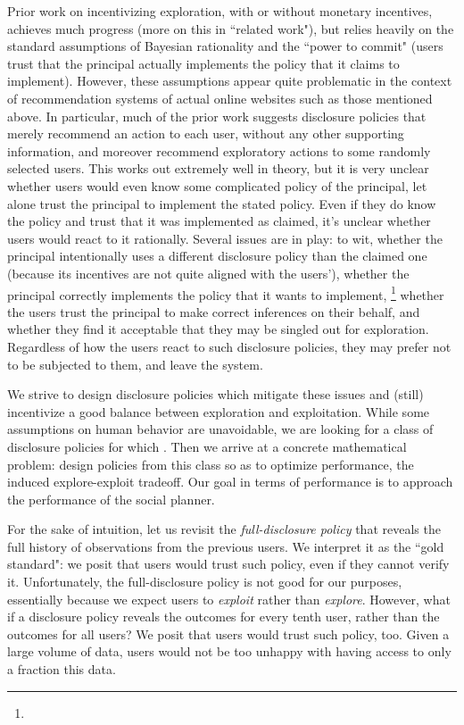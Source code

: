  Prior work on incentivizing exploration, with or without monetary incentives, achieves much progress (more on this in ``related work"), but relies heavily on the standard assumptions of Bayesian rationality and the ``power to commit" (\ie users trust that the principal actually implements the policy that it claims to implement). However, these assumptions appear quite problematic in the context of recommendation systems of actual online websites such as those mentioned above. In particular, much of the prior work suggests disclosure policies that merely recommend an action to each user, without any other supporting information, and moreover recommend exploratory actions to some randomly selected users. This works out extremely well in theory, but it is very unclear whether users would even know some complicated policy of the principal, let alone trust the principal to implement the stated policy. Even if they do know the policy and trust that it was implemented as claimed, it's unclear whether users would react to it rationally.
%
Several issues are in play: to wit, whether the principal intentionally uses a different disclosure policy than the claimed one (\eg because its incentives are not quite aligned with the users'), whether the principal correctly implements the policy that it wants to implement,%
\footnote{}
 whether the users trust the principal to make correct inferences on their behalf, and whether they find it acceptable that they may be singled out for exploration. Regardless of how the users react to such disclosure policies, they may prefer not to be subjected to them, and leave the system.

We strive to design disclosure policies which mitigate these issues and (still) incentivize a good balance between exploration and exploitation. While some assumptions on human behavior are unavoidable, we are looking for a class of disclosure policies for which . Then we arrive at a concrete mathematical problem: design policies from this class so as to optimize performance, \ie  the induced explore-exploit tradeoff. Our goal in terms of performance is to approach the performance of the social planner.

For the sake of intuition, let us revisit the \emph{full-disclosure policy} that reveals the full history of observations from the previous users. We interpret it as the ``gold standard": we posit that users would trust such policy, even if they cannot verify it. Unfortunately, the full-disclosure policy is not good for our purposes, essentially because we expect users to \emph{exploit} rather than \emph{explore}. However, what if a disclosure policy reveals the outcomes for every tenth user, rather than the outcomes for all users? We posit that users would trust such policy, too. Given a large volume of data, users would not be too unhappy with having access to only a fraction this data. 

